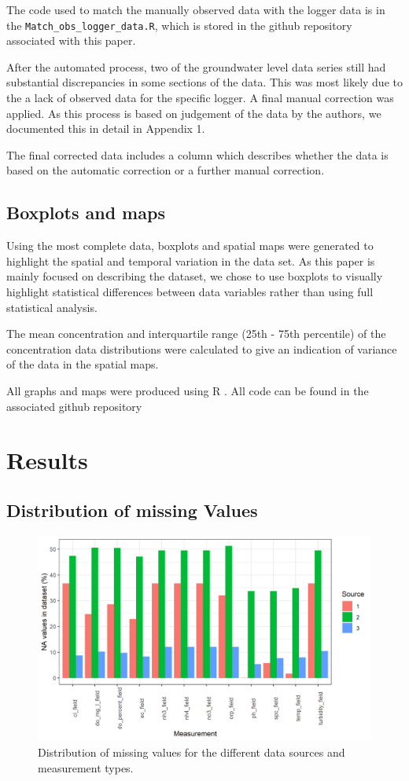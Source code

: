 \documentclass[, manuscript]{copernicus}
\begin{document}
The code used to match the manually observed data with the logger data
is in the \texttt{Match\_obs\_logger\_data.R}, which is stored in the
github repository associated with this paper.

After the automated process, two of the groundwater level data series
still had substantial discrepancies in some sections of the data. This
was most likely due to the a lack of observed data for the specific
logger. A final manual correction was applied. As this process is based
on judgement of the data by the authors, we documented this in detail in
Appendix 1.

The final corrected data includes a column which describes whether the
data is based on the automatic correction or a further manual
correction.

\subsection{Boxplots and maps}

Using the most complete data, boxplots and spatial maps were generated
to highlight the spatial and temporal variation in the data set. As this
paper is mainly focused on describing the dataset, we chose to use
boxplots to visually highlight statistical differences between data
variables rather than using full statistical analysis.

The mean concentration and interquartile range (25th - 75th percentile)
of the concentration data distributions were calculated to give an
indication of variance of the data in the spatial maps.

All graphs and maps were produced using R \citep{R2022}. All code can be
found in the associated github repository

\section{Results}

\subsection{Distribution of missing Values}

\clearpage
\begin{figure}
\includegraphics[width=0.9\linewidth]{Figures/na_count} \caption{Distribution of missing values for the different data sources and measurement types.}\label{fig:na-plot}
\end{figure}
\end{document}

